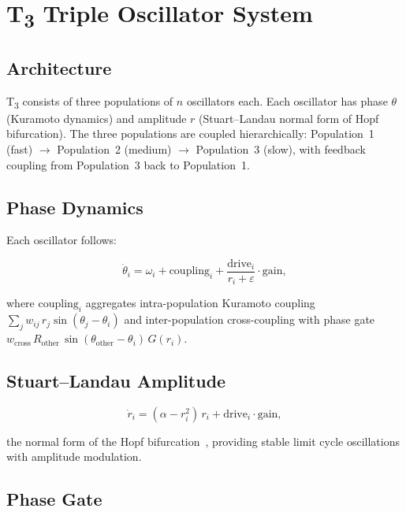 \documentclass[twocolumn,10pt]{article}
\newcommand{\Tthree}{T\textsubscript{3}}
\begin{document}
\section{\Tthree{} Triple Oscillator System}

\subsection{Architecture}

\Tthree{} consists of three populations of $n$ oscillators each. Each oscillator has phase $\theta$ (Kuramoto dynamics) and amplitude $r$ (Stuart--Landau normal form of Hopf bifurcation). The three populations are coupled hierarchically: Population~1 (fast) $\rightarrow$ Population~2 (medium) $\rightarrow$ Population~3 (slow), with feedback coupling from Population~3 back to Population~1.

\subsection{Phase Dynamics}

Each oscillator follows:

\begin{equation}
\dot{\theta}_i = \omega_i + \text{coupling}_i + \frac{\text{drive}_i}{r_i + \varepsilon}\cdot\text{gain},
\end{equation}

where $\text{coupling}_i$ aggregates intra-population Kuramoto coupling $\sum_j w_{ij}\,r_j\sin(\theta_j-\theta_i)$ and inter-population cross-coupling with phase gate $w_{\text{cross}}\,R_{\text{other}}\,\sin(\theta_{\text{other}}-\theta_i)\,G(r_i)$.

\subsection{Stuart--Landau Amplitude}

\begin{equation}
\dot{r}_i = (\alpha - r_i^2)\,r_i + \text{drive}_i\cdot\text{gain},
\end{equation}

the normal form of the Hopf bifurcation~\cite{stuart1958}, providing stable limit cycle oscillations with amplitude modulation.

\subsection{Phase Gate}
\end{document}
